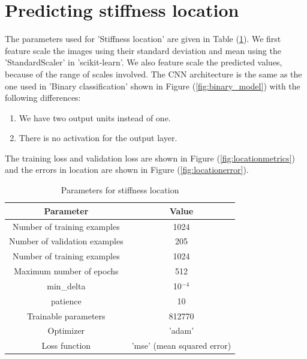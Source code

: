 \documentclass{article}
\begin{document}
\section{Predicting stiffness location}
%
The parameters used for 'Stiffness location' are given in Table (\ref{tab:stifflocparam}). We first feature scale the images using their standard deviation and mean using the 'StandardScaler' in 'scikit-learn'. We also feature scale the predicted values, because of the range of scales involved. The CNN architecture is the same as the one used in 'Binary classification' shown in Figure (\ref{fig:binary_model}) with the following differences:
\begin{enumerate}
\item{We have two output units instead of one.}
\item{There is no activation for the output layer.}
\end{enumerate}
The training loss and validation loss are shown in Figure (\ref{fig:locationmetrics}) and the errors in location are shown in Figure (\ref{fig:locationerror}).
\begin{table}
  \centering
  \begin{tabular}{|c|c|}
    \hline
    Parameter & Value \\
    \hline
    Number of training examples   & 1024 \\
    Number of validation examples & 205 \\
    Number of training examples   & 1024 \\
    Maximum number of epochs      & 512 \\
    min{\_}delta      & 10$^{-4}$\\
    patience                      & 10  \\
    Trainable parameters          & 812770\\
    Optimizer         & 'adam'     \\
    Loss function     & 'mse' (mean squared error) \\
    \hline
  \end{tabular}
  \caption{\label{tab:stifflocparam} Parameters for stiffness location}
\end{table}
%
\end{document}

